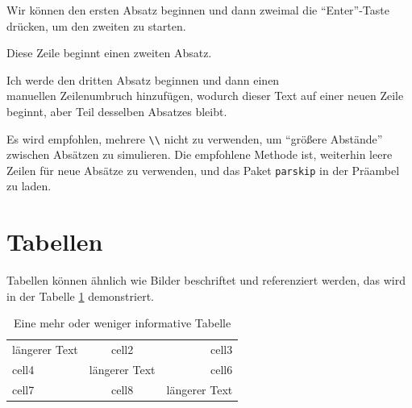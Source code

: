 \documentclass{article}
\begin{document}
Wir können den ersten Absatz beginnen und dann zweimal die ``Enter''-Taste drücken, um den zweiten zu starten.

Diese Zeile beginnt einen zweiten Absatz.

Ich werde den dritten Absatz beginnen und dann einen \\ manuellen Zeilenumbruch hinzufügen, wodurch dieser Text auf einer neuen Zeile beginnt, aber Teil desselben Absatzes bleibt.

Es wird empfohlen, mehrere \verb|\\| nicht zu verwenden, um ``größere Abstände'' zwischen Absätzen zu simulieren. Die empfohlene Methode ist, weiterhin leere Zeilen für neue Absätze zu verwenden, und das Paket \texttt{parskip} in der Präambel zu laden.

\section{Tabellen}

Tabellen können ähnlich wie Bilder beschriftet und referenziert werden, das wird in der Tabelle \ref{table:data} demonstriert.

\begin{table}[ht]
    \centering
    \begin{tabular}{|l|c|r|} 
         \hline
         längerer Text & cell2         & cell3 \\ 
         cell4         & längerer Text & cell6 \\ 
         cell7         & cell8         & längerer Text \\ 
         \hline
    \end{tabular}
    \caption{Eine mehr oder weniger informative Tabelle}
    \label{table:data}
\end{table}
\end{document}
